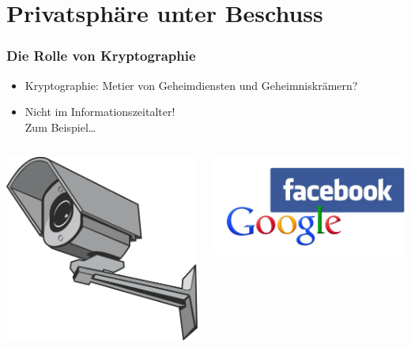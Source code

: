 \documentclass{beamer}
\begin{document}
\section{Privatsphäre unter Beschuss}

\begin{frame}
\frametitle{Die Rolle von Kryptographie}

\begin{itemize}
	\item Kryptographie: Metier von Geheimdiensten und Geheimniskrämern?
	\item Nicht im Informationszeitalter!\\Zum Beispiel\dots
\end{itemize}
\begin{columns}

\pause	\includegraphics[height=0.2\textheight]{images/surveillancecamera.pdf}

\pause	\includegraphics[height=0.2\textheight]{images/fbgoogle.png}

\end{columns}
\end{frame}
\end{document}
